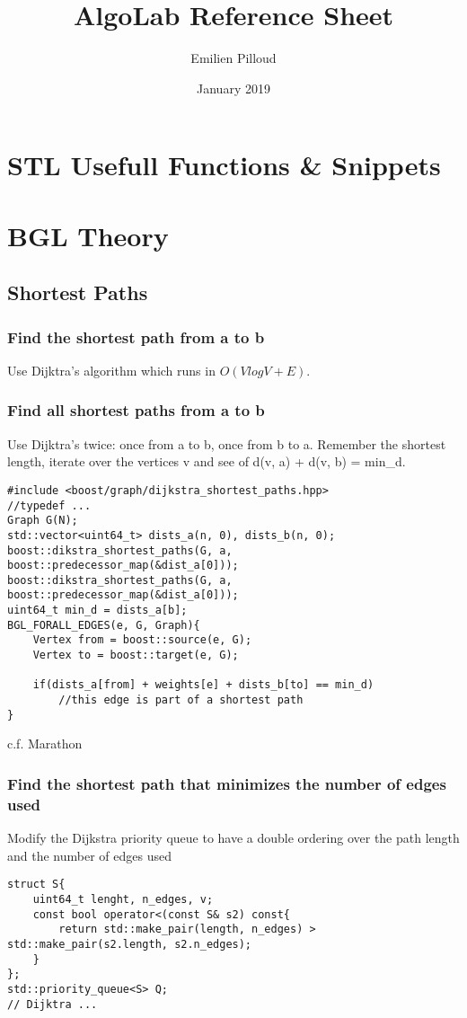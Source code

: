 \documentclass{article}
\title{AlgoLab Reference Sheet}
\author{Emilien Pilloud}
\date{January 2019}
\begin{document}
\maketitle

\section{STL Usefull Functions \& Snippets}

\section{BGL Theory}
\subsection{Shortest Paths}
\subsubsection{Find the shortest path from a to b}
Use Dijktra's algorithm which runs in $O(V log V + E)$.
\subsubsection{Find all shortest paths from a to b}
Use Dijktra's twice: once from a to b, once from b to a. Remember the shortest length, iterate over the vertices v and see of d(v, a) + d(v, b) = min\_d.
\begin{lstlisting}[frame=single]
#include <boost/graph/dijkstra_shortest_paths.hpp>
//typedef ...
Graph G(N);
std::vector<uint64_t> dists_a(n, 0), dists_b(n, 0);
boost::dikstra_shortest_paths(G, a, boost::predecessor_map(&dist_a[0]));
boost::dikstra_shortest_paths(G, a, boost::predecessor_map(&dist_a[0]));
uint64_t min_d = dists_a[b];
BGL_FORALL_EDGES(e, G, Graph){
    Vertex from = boost::source(e, G);
    Vertex to = boost::target(e, G);
    
    if(dists_a[from] + weights[e] + dists_b[to] == min_d)
        //this edge is part of a shortest path
}
\end{lstlisting}
c.f. Marathon
\subsubsection{Find the shortest path that minimizes the number of edges used}
Modify the Dijkstra priority queue to have a double ordering over the path length and the number of edges used
\begin{lstlisting}[frame=single]
struct S{
    uint64_t lenght, n_edges, v;
    const bool operator<(const S& s2) const{
        return std::make_pair(length, n_edges) > std::make_pair(s2.length, s2.n_edges);
    }
};
std::priority_queue<S> Q;
// Dijktra ...
\end{lstlisting}
\end{document}
